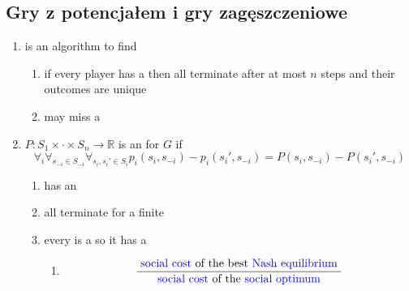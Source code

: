 \documentclass{article}
\newcommand\wassterm[1]{{\color{blue}{#1}}}
\begin{document}
\subsection{Gry z potencjałem i gry zagęszczeniowe}

\begin{enumerate}

  \item
    \wassterm{best response dynamics}
    is an algorithm to find
    \wassterm{Nash equilibrium}

    \begin{enumerate}
      \item
        if every player has a 
        \wassterm{strictly dominant strategy}
        then all
        \wassterm{best response dynamics}
        terminate after at most $n$ steps and their outcomes are unique
      \item
        \wassterm{best response dynamics}
        may miss a
        \wassterm{Nash equilibrium}
    \end{enumerate}
  \item
    $P: S_1\times \cdot \times S_n \rightarrow \mathbb{R}$ is an
    \wassterm{exact potential function}
    for $G$ if
    $$
    \forall_i \forall_{s_{-i} \in S_{-i}} \forall_{s_i, s_i' \in S_i}
    p_i(s_i, s_{-i}) -
    p_i(s_i', s_{-i}) = 
    P(s_i, s_{-i}) -
    P(s_i', s_{-i})
    $$
    \begin{enumerate}
      \item
        \wassterm{potential game}
        has an
        \wassterm{exact potential function}

      \item
        all
        \wassterm{best response dynamics}
        terminate for a finite
        \wassterm{potential game}

      \item
        every
        \wassterm{congestion game}
        is a
        \wassterm{potential game}
        so it has a
        \wassterm{Nash equilibrium}

        \begin{enumerate}
          \item
            \wassterm{price of stability}
            $$
            \frac{\text{
              \wassterm{social cost}
            of the best
            \wassterm{Nash equilibrium}
            }}{{\text{
              \wassterm{social cost}
            of the
            \wassterm{social optimum} 
            }}}
            $$
        \end{enumerate}
    \end{enumerate}

\end{enumerate}
\end{document}
